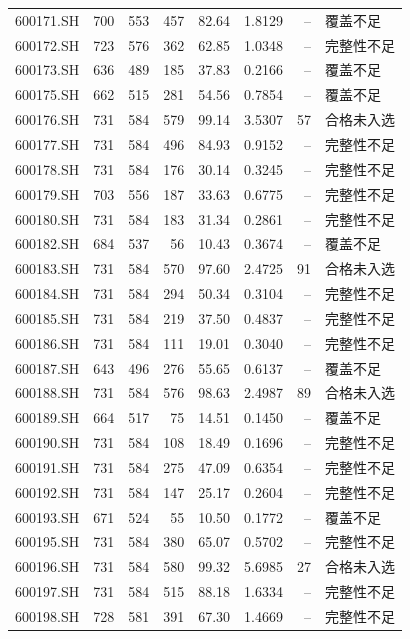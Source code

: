 \documentclass[10pt,a4paper]{article}
\begin{document}
\begin{longtable}{lrrr r r r l}
600171.SH & 700 & 553 & 457 & 82.64 & 1.8129 & -- & 覆盖不足\\
600172.SH & 723 & 576 & 362 & 62.85 & 1.0348 & -- & 完整性不足\\
600173.SH & 636 & 489 & 185 & 37.83 & 0.2166 & -- & 覆盖不足\\
600175.SH & 662 & 515 & 281 & 54.56 & 0.7854 & -- & 覆盖不足\\
600176.SH & 731 & 584 & 579 & 99.14 & 3.5307 & 57 & 合格未入选\\
600177.SH & 731 & 584 & 496 & 84.93 & 0.9152 & -- & 完整性不足\\
600178.SH & 731 & 584 & 176 & 30.14 & 0.3245 & -- & 完整性不足\\
600179.SH & 703 & 556 & 187 & 33.63 & 0.6775 & -- & 完整性不足\\
600180.SH & 731 & 584 & 183 & 31.34 & 0.2861 & -- & 完整性不足\\
600182.SH & 684 & 537 & 56 & 10.43 & 0.3674 & -- & 覆盖不足\\
600183.SH & 731 & 584 & 570 & 97.60 & 2.4725 & 91 & 合格未入选\\
600184.SH & 731 & 584 & 294 & 50.34 & 0.3104 & -- & 完整性不足\\
600185.SH & 731 & 584 & 219 & 37.50 & 0.4837 & -- & 完整性不足\\
600186.SH & 731 & 584 & 111 & 19.01 & 0.3040 & -- & 完整性不足\\
600187.SH & 643 & 496 & 276 & 55.65 & 0.6137 & -- & 覆盖不足\\
600188.SH & 731 & 584 & 576 & 98.63 & 2.4987 & 89 & 合格未入选\\
600189.SH & 664 & 517 & 75 & 14.51 & 0.1450 & -- & 覆盖不足\\
600190.SH & 731 & 584 & 108 & 18.49 & 0.1696 & -- & 完整性不足\\
600191.SH & 731 & 584 & 275 & 47.09 & 0.6354 & -- & 完整性不足\\
600192.SH & 731 & 584 & 147 & 25.17 & 0.2604 & -- & 完整性不足\\
600193.SH & 671 & 524 & 55 & 10.50 & 0.1772 & -- & 覆盖不足\\
600195.SH & 731 & 584 & 380 & 65.07 & 0.5702 & -- & 完整性不足\\
600196.SH & 731 & 584 & 580 & 99.32 & 5.6985 & 27 & 合格未入选\\
600197.SH & 731 & 584 & 515 & 88.18 & 1.6334 & -- & 完整性不足\\
600198.SH & 728 & 581 & 391 & 67.30 & 1.4669 & -- & 完整性不足\\

\end{longtable}
\end{document}
